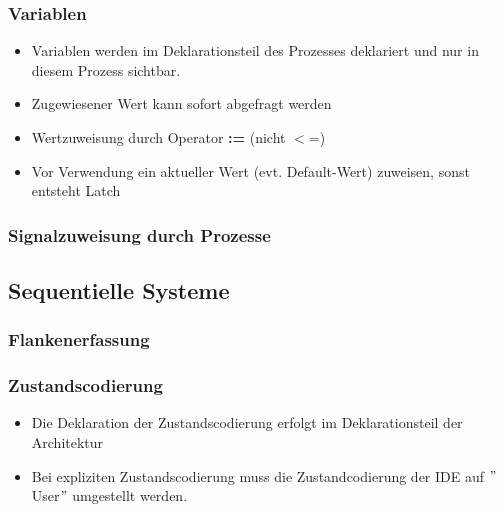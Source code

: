 		\subsubsection{Variablen}
			\begin{multicols}{2}
				\begin{itemize}
					\item Variablen werden im Deklarationsteil des Prozesses deklariert 
						und nur in diesem Prozess sichtbar.
					\item Zugewiesener Wert kann sofort abgefragt werden
					\item Wertzuweisung durch Operator \textbf{:=} (nicht $<$=)
					\item Vor Verwendung ein aktueller Wert (evt. Default-Wert) zuweisen, 
						sonst entsteht Latch
				\end{itemize}
				
			\end{multicols}

		\subsubsection{Signalzuweisung durch Prozesse}
			\begin{multicols}{2}
				
			\end{multicols}

	\subsection{Sequentielle Systeme}
		\subsubsection{Flankenerfassung}
			\begin{multicols}{2}
				
			\end{multicols}
		\subsubsection{Zustandscodierung}
			\begin{multicols}{2}
				\begin{itemize}
					\item Die Deklaration der Zustandscodierung erfolgt im Deklarationsteil 						der Architektur
					\item Bei expliziten Zustandscodierung muss die Zustandcodierung der 
						IDE auf $"$User$"$ umgestellt werden.
				\end{itemize}
				
			\end{multicols}
